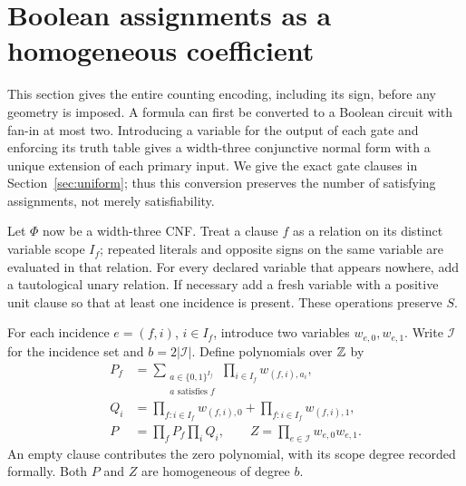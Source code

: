 \section{Boolean assignments as a homogeneous coefficient}
This section gives the entire counting encoding, including its sign, before any geometry is imposed. A formula can first be converted to a Boolean circuit with fan-in at most two. Introducing a variable for the output of each gate and enforcing its truth table gives a width-three conjunctive normal form with a unique extension of each primary input. We give the exact gate clauses in Section~\ref{sec:uniform}; thus this conversion preserves the number of satisfying assignments, not merely satisfiability.

Let $\Phi$ now be a width-three CNF. Treat a clause $f$ as a relation on its distinct variable scope $I_f$; repeated literals and opposite signs on the same variable are evaluated in that relation. For every declared variable that appears nowhere, add a tautological unary relation. If necessary add a fresh variable with a positive unit clause so that at least one incidence is present. These operations preserve $S$.

For each incidence $e=(f,i)$, $i\in I_f$, introduce two variables $w_{e,0},w_{e,1}$. Write $\mathcal I$ for the incidence set and $b=2|\mathcal I|$. Define polynomials over $\mathbb Z$ by
\begin{align}
P_f&=\sum_{\substack{a\in\{0,1\}^{I_f}\\a\text{ satisfies }f}}
                 \prod_{i\in I_f}w_{(f,i),a_i},\label{eq:local-clause}\\
Q_i&=\prod_{f:i\in I_f}w_{(f,i),0}
       +\prod_{f:i\in I_f}w_{(f,i),1},\nonumber\\
P&=\prod_f P_f\prod_iQ_i,\qquad
Z=\prod_{e\in\mathcal I}w_{e,0}w_{e,1}.\label{eq:incidence}
\end{align}
An empty clause contributes the zero polynomial, with its scope degree recorded formally. Both $P$ and $Z$ are homogeneous of degree $b$.

